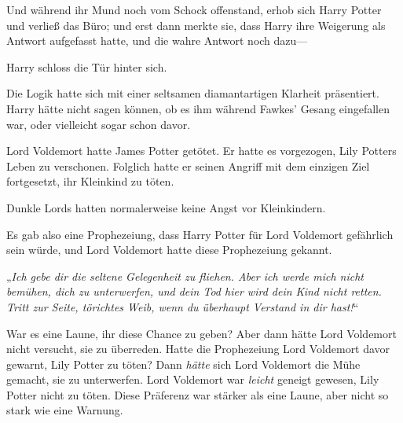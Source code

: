Und während ihr Mund noch vom Schock offenstand, erhob sich Harry Potter und verließ das Büro; und erst dann merkte sie, dass Harry ihre Weigerung als Antwort aufgefasst hatte, und die wahre Antwort noch dazu—

Harry schloss die Tür hinter sich.

Die Logik hatte sich mit einer seltsamen diamantartigen Klarheit präsentiert. Harry hätte nicht sagen können, ob es ihm während Fawkes' Gesang eingefallen war, oder vielleicht sogar schon davor.

Lord Voldemort hatte James Potter getötet. Er hatte es vorgezogen, Lily Potters Leben zu verschonen. Folglich hatte er seinen Angriff mit dem einzigen Ziel fortgesetzt, ihr Kleinkind zu töten.

Dunkle Lords hatten normalerweise keine Angst vor Kleinkindern.

Es gab also eine Prophezeiung, dass Harry Potter für Lord Voldemort gefährlich sein würde, und Lord Voldemort hatte diese Prophezeiung gekannt.

„\emph{Ich gebe dir die seltene Gelegenheit zu fliehen. Aber ich werde mich nicht bemühen, dich zu unterwerfen, und dein Tod hier wird dein Kind nicht retten. Tritt zur Seite, törichtes Weib, wenn du überhaupt Verstand in dir hast!}“

War es eine Laune, ihr diese Chance zu geben? Aber dann hätte Lord Voldemort nicht versucht, sie zu überreden. Hatte die Prophezeiung Lord Voldemort davor gewarnt, Lily Potter zu töten? Dann \emph{hätte} sich Lord Voldemort die Mühe gemacht, sie zu unterwerfen. Lord Voldemort war \emph{leicht} geneigt gewesen, Lily Potter nicht zu töten. Diese Präferenz war stärker als eine Laune, aber nicht so stark wie eine Warnung.

